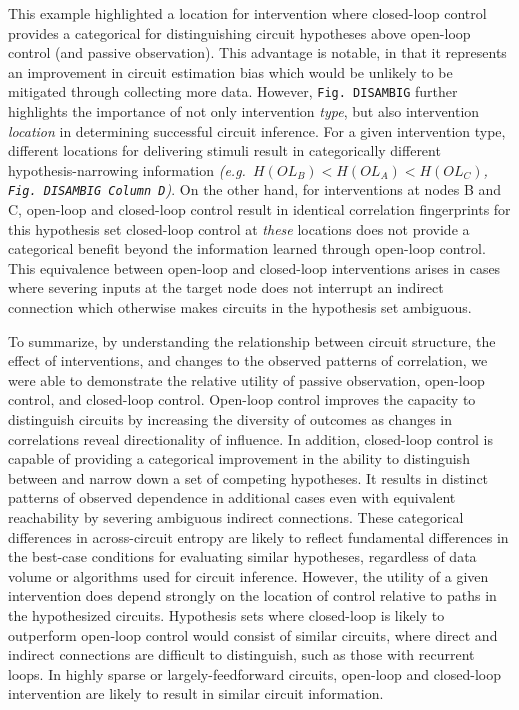 \documentclass{article}
\begin{document}
This example highlighted a location for intervention where closed-loop control provides a categorical for distinguishing circuit hypotheses above open-loop control (and passive observation). This advantage is notable, in that it represents an improvement in circuit estimation bias which would be unlikely to be mitigated through collecting more data. However, \texttt{Fig.\ DISAMBIG} further highlights the importance of not only intervention \emph{type}, but also intervention \emph{location}
in determining successful circuit inference. For a given intervention type, different locations for delivering stimuli result in categorically different hypothesis-narrowing information
\emph{(e.g.~\(H(OL_B) < H(OL_A) < H(OL_C)\),
\texttt{Fig.\ DISAMBIG\ Column\ D})}. On the other hand, for interventions at nodes B and C, open-loop and closed-loop control result in identical correlation fingerprints for this hypothesis set 
closed-loop control at \emph{these} locations does not provide a categorical benefit beyond the information learned through open-loop control. This equivalence between open-loop and closed-loop interventions arises in cases where severing inputs at the target node does not interrupt an indirect connection which otherwise makes circuits in the hypothesis set ambiguous.

To summarize, by understanding the relationship between circuit structure, the effect of interventions, and changes to the observed patterns of correlation, we were able to demonstrate the relative utility of passive observation, open-loop control, and closed-loop control. Open-loop control improves the capacity to distinguish circuits by increasing the diversity of outcomes as changes in correlations reveal directionality of influence. In addition, closed-loop control is capable of providing a categorical improvement in the ability to distinguish between and narrow down a set of competing hypotheses. It results in distinct patterns of observed dependence in additional cases even with equivalent reachability by severing ambiguous indirect connections. These categorical differences in across-circuit entropy are likely to reflect fundamental differences in the best-case conditions for evaluating similar hypotheses, regardless of data volume or algorithms used for circuit inference. However, the utility of a given intervention does depend strongly on the location of control relative to paths in the hypothesized circuits. Hypothesis sets where closed-loop is likely to outperform open-loop control would consist of similar circuits, where direct and indirect connections are difficult to distinguish, such as those with recurrent loops. In highly sparse or largely-feedforward circuits, open-loop and closed-loop intervention are likely to result in similar circuit information.
\end{document}
